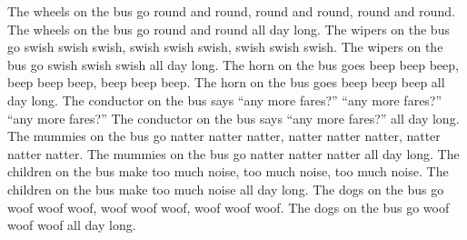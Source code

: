 \begin{minipage}{\linewidth}\frenchspacing
The wheels on the bus go round and round, round and round, round
and round. The wheels on the bus go round and round all day long.
The wipers on the bus go swish swish swish, swish swish swish,
swish swish swish. The wipers on the bus go swish swish swish all
day long. The horn on the bus goes beep beep beep, beep beep beep,
beep beep beep. The horn on the bus goes beep beep beep all day 
long. The conductor on the bus says ``any more fares?'' ``any more
fares?'' ``any more fares?'' The conductor on the bus says
``any more fares?'' all day long. The mummies on the bus go
natter natter natter, natter natter natter, natter natter natter.
The mummies on the bus go natter natter natter all day long. The
children on the bus make too much noise, too much noise, too much
noise. The children on the bus make too much noise all day long.
The dogs on the bus go woof woof woof, woof woof woof, woof woof
woof. The dogs on the bus go woof woof woof all day long.
\end{minipage}
